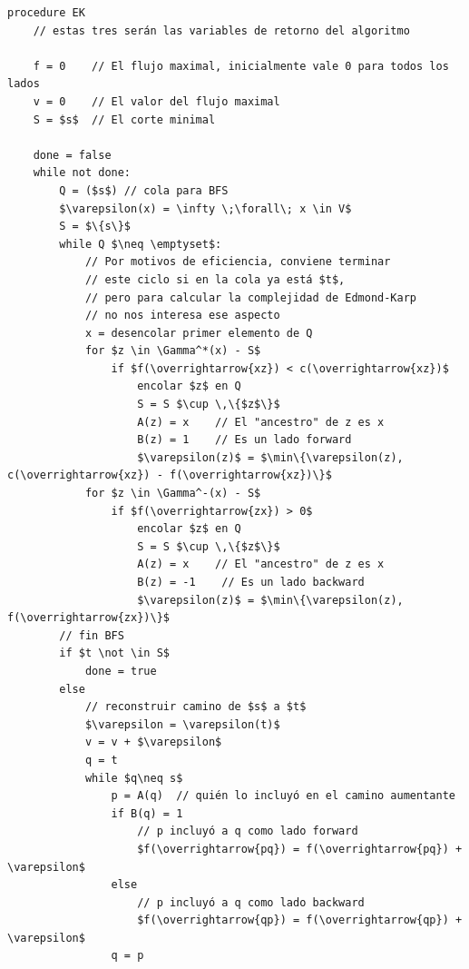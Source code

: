 \documentclass[10pt,a4paper]{article}
\begin{document}
    \begin{lstlisting}[language=pseudo]
procedure EK
    // estas tres serán las variables de retorno del algoritmo

    f = 0    // El flujo maximal, inicialmente vale 0 para todos los lados
    v = 0    // El valor del flujo maximal
    S = $s$  // El corte minimal

    done = false
    while not done:
        Q = ($s$) // cola para BFS
        $\varepsilon(x) = \infty \;\forall\; x \in V$
        S = $\{s\}$
        while Q $\neq \emptyset$:
            // Por motivos de eficiencia, conviene terminar
            // este ciclo si en la cola ya está $t$,
            // pero para calcular la complejidad de Edmond-Karp
            // no nos interesa ese aspecto
            x = desencolar primer elemento de Q
            for $z \in \Gamma^*(x) - S$
                if $f(\overrightarrow{xz}) < c(\overrightarrow{xz})$
                    encolar $z$ en Q
                    S = S $\cup \,\{$z$\}$
                    A(z) = x    // El "ancestro" de z es x
                    B(z) = 1    // Es un lado forward
                    $\varepsilon(z)$ = $\min\{\varepsilon(z), c(\overrightarrow{xz}) - f(\overrightarrow{xz})\}$
            for $z \in \Gamma^-(x) - S$
                if $f(\overrightarrow{zx}) > 0$
                    encolar $z$ en Q
                    S = S $\cup \,\{$z$\}$
                    A(z) = x    // El "ancestro" de z es x
                    B(z) = -1    // Es un lado backward
                    $\varepsilon(z)$ = $\min\{\varepsilon(z), f(\overrightarrow{zx})\}$
        // fin BFS
        if $t \not \in S$
            done = true
        else
            // reconstruir camino de $s$ a $t$
            $\varepsilon = \varepsilon(t)$
            v = v + $\varepsilon$
            q = t
            while $q\neq s$
                p = A(q)  // quién lo incluyó en el camino aumentante
                if B(q) = 1
                    // p incluyó a q como lado forward
                    $f(\overrightarrow{pq}) = f(\overrightarrow{pq}) + \varepsilon$
                else
                    // p incluyó a q como lado backward
                    $f(\overrightarrow{qp}) = f(\overrightarrow{qp}) + \varepsilon$
                q = p
\end{lstlisting}
\end{document}
